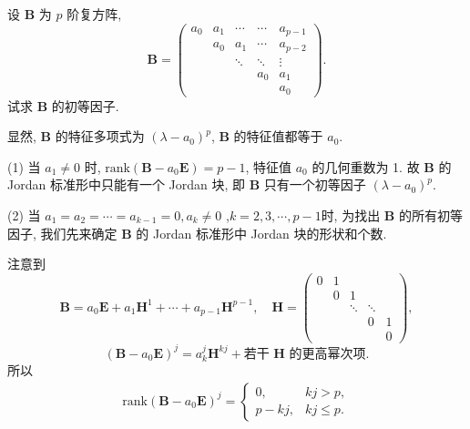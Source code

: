 \documentclass[../../main.tex]{subfiles}
\begin{document}
\begin{solution}
\end{solution}

\begin{example}
设 $\boldsymbol{B}$ 为 $p$ 阶复方阵,
\[
\boldsymbol{B} = \begin{pmatrix} 
a_0 & a_1 & \cdots & \cdots & a_{p-1} \\
& a_0 & a_1 & \cdots & a_{p-2} \\
& & \ddots & \ddots & \vdots \\
& & & a_0 & a_1 \\
& & & & a_0 
\end{pmatrix}.
\]
试求 $\boldsymbol{B}$ 的初等因子.
\end{example}
\begin{solution}
显然, $\boldsymbol{B}$ 的特征多项式为 $(\lambda - a_0)^p$, $\boldsymbol{B}$ 的特征值都等于 $a_0$.

(1) 当 $a_1 \neq 0$ 时, $\mathrm{rank}(\boldsymbol{B} - a_0\boldsymbol{E}) = p - 1$, 特征值 $a_0$ 的几何重数为 1. 故 $\boldsymbol{B}$ 的 Jordan 标准形中只能有一个 Jordan 块, 即 $\boldsymbol{B}$ 只有一个初等因子 $(\lambda - a_0)^p$.

(2) 当 $a_1 = a_2 = \cdots = a_{k-1} = 0, a_k \neq 0$ ,$k=2,3,\cdots,p-1$时, 为找出 $\boldsymbol{B}$ 的所有初等因子, 我们先来确定 $\boldsymbol{B}$ 的 Jordan 标准形中 Jordan 块的形状和个数.

注意到
\[
\boldsymbol{B} = a_0\boldsymbol{E} + a_1\boldsymbol{H}^1 + \cdots + a_{p-1}\boldsymbol{H}^{p-1}, \quad \boldsymbol{H} = \begin{pmatrix} 
0 & 1 & & \\
& 0 & 1 & \\
& & \ddots & \ddots \\
& & & 0 & 1 \\
& & & & 0 
\end{pmatrix},
\]
\[
(\boldsymbol{B} - a_0\boldsymbol{E})^j = a_k^j\boldsymbol{H}^{kj} + \text{若干 } \boldsymbol{H} \text{ 的更高幂次项}.
\]
所以
\begin{align}
\mathrm{rank}(\boldsymbol{B} - a_0\boldsymbol{E})^j = \begin{cases} 
0, & kj > p, \\
p - kj, & kj \leqslant p.
\end{cases}\label{eq::::::--000002}
\end{align}


\end{solution}
\end{document}
